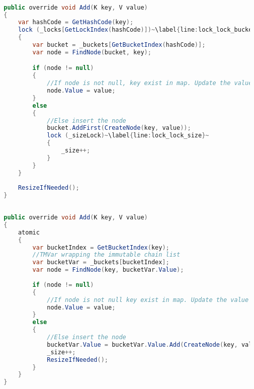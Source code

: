 \begin{lstlisting}[float,label=lst:lock_add_hashmap,
  caption={ConcurrentHashMap \bscode{Add} Method - Locking},
  language=Java,  
  showspaces=false,
  showtabs=false,
  breaklines=true,
  showstringspaces=false,
  breakatwhitespace=true,
  escapechar=~,
  commentstyle=\color{greencomments},
  keywordstyle=\color{bluekeywords},
  stringstyle=\color{redstrings},
  morekeywords={atomic, retry, orelse, var, get, set, ref, out}]  % Start your code-block

  public override void Add(K key, V value)
  {
      var hashCode = GetHashCode(key);
      lock (_locks[GetLockIndex(hashCode)])~\label{line:lock_lock_bucket}~
      {
          var bucket = _buckets[GetBucketIndex(hashCode)];
          var node = FindNode(bucket, key);

          if (node != null)
          {
              //If node is not null, key exist in map. Update the value
              node.Value = value;
          }
          else
          {
              //Else insert the node
              bucket.AddFirst(CreateNode(key, value));
              lock (_sizeLock)~\label{line:lock_lock_size}~
              {
                  _size++;
              }
          }
      }
      
      ResizeIfNeeded();
  }
\end{lstlisting}

\begin{lstlisting}[float,label=lst:lang_add_hashmap,
  caption={ConcurrentHashMap \bscode{Add} Method - \stmname},
  language=Java,  
  showspaces=false,
  showtabs=false,
  breaklines=true,
  showstringspaces=false,
  breakatwhitespace=true,
  escapechar=~,
  commentstyle=\color{greencomments},
  keywordstyle=\color{bluekeywords},
  stringstyle=\color{redstrings},
  morekeywords={atomic, retry, orelse, var, get, set, ref, out}]  % Start your code-block
  
  public override void Add(K key, V value)
  {
      atomic
      {
          var bucketIndex = GetBucketIndex(key);
          //TMVar wrapping the immutable chain list
          var bucketVar = _buckets[bucketIndex];
          var node = FindNode(key, bucketVar.Value);
         
          if (node != null)
          {
              //If node is not null key exist in map. Update the value
              node.Value = value;
          }
          else
          {
              //Else insert the node
              bucketVar.Value = bucketVar.Value.Add(CreateNode(key, value));
              _size++;
              ResizeIfNeeded();
          }
      }
  }
\end{lstlisting}

